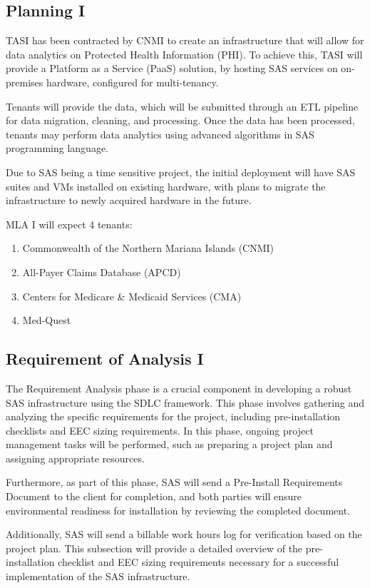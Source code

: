\subsection{Planning I} 

TASI has been contracted by CNMI to create an infrastructure that will allow for data analytics on Protected Health Information (PHI). To achieve this, TASI will provide a Platform as a Service (PaaS) solution, by hosting SAS services on on-premises hardware, configured for multi-tenancy.

Tenants will provide the data, which will be submitted through an ETL pipeline for data migration, cleaning, and processing. Once the data has been processed, tenants may perform data analytics using advanced algorithms in SAS programming language.

Due to SAS being a time sensitive project, the initial deployment will have SAS suites and VMs installed on existing hardware, with plans to migrate the infrastructure to newly acquired hardware in the future.

MLA I will expect 4 tenants:
\begin{enumerate}
    \item Commonwealth of the Northern Mariana Islands (CNMI)
    \item All-Payer Claims Database (APCD)
    \item Centers for Medicare \& Medicaid Services (CMA)
    \item Med-Quest
\end{enumerate}

\subsection{Requirement of Analysis I}

The Requirement Analysis phase is a crucial component in developing a robust SAS infrastructure using the SDLC framework. This phase involves gathering and analyzing the specific requirements for the project, including pre-installation checklists and EEC sizing requirements. In this phase, ongoing project management tasks will be performed, such as preparing a project plan and assigning appropriate resources. 

Furthermore, as part of this phase, SAS will send a Pre-Install Requirements Document to the client for completion, and both parties will ensure environmental readiness for installation by reviewing the completed document. 

Additionally, SAS will send a billable work hours log for verification based on the project plan. This subsection will provide a detailed overview of the pre-installation checklist and EEC sizing requirements necessary for a successful implementation of the SAS infrastructure.

